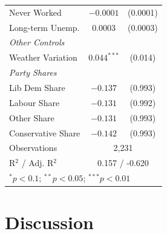 \documentclass[12pt,letterpaper]{article}
\begin{document}
\begin{table}[!htbp]
\begin{tabular}{lcc}
		\hspace{3mm}Never Worked & $-0.0001$ & (0.0001) \\
		\hspace{3mm}Long-term Unemp. & $0.0003$ & (0.0003) \\
		\textit{Other Controls} \\
		\hspace{3mm}Weather Variation & $0.044^{***}$ & (0.014) \\
		\textit{Party Shares} \\
		\hspace{3mm}Lib Dem Share & $-0.137$ & (0.993) \\
		\hspace{3mm}Labour Share & $-0.131$ & (0.992) \\
		\hspace{3mm}Other Share & $-0.131$ & (0.993) \\
		\hspace{3mm}Conservative Share & $-0.142$ & (0.993) \\
		\midrule
		Observations & \multicolumn{2}{c}{2,231} \\
		R$^2$ / Adj. R$^2$ & \multicolumn{2}{c}{0.157 / -0.620} \\
		\bottomrule
		\multicolumn{3}{l}{\footnotesize{$^{*}p<0.1$; $^{**}p<0.05$; $^{***}p<0.01$}}
	\end{tabular}
\end{table}


\newpage



\section{Discussion}
\end{document}

